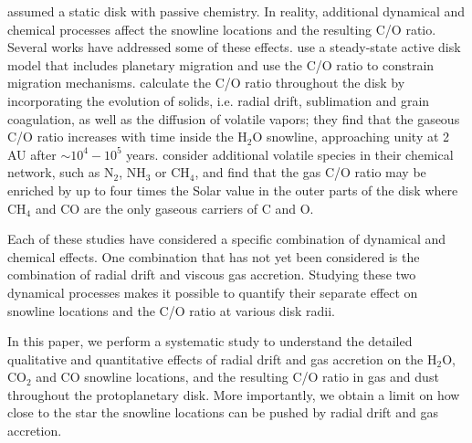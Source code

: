 \documentclass[apj]{emulateapj}
\newcommand{\emgr}[1]{\emph{ \color{gray} #1}}
\begin{document}
 
\citet{oberg11} assumed a static disk with passive chemistry. In reality, additional dynamical and chemical processes affect the snowline locations and the resulting C/O ratio. Several works have addressed some of these effects. \citet{madhu14} use a steady-state active disk model that includes planetary migration and use the C/O ratio to constrain migration mechanisms. \citealt{alidib14} calculate the C/O ratio throughout the disk by incorporating the evolution of solids, i.e. radial drift, sublimation and grain coagulation, as well as the diffusion of volatile vapors; they find that the gaseous C/O ratio increases with time inside the H$_2$O snowline, approaching unity at 2 AU after $\sim$$10^4-10^5$ years.  \citet{thiabaud15} consider additional volatile species in their chemical network, such as N$_2$, NH$_3$ or CH$_4$, and find that the gas C/O ratio may be enriched by up to four times the Solar value in the outer parts of the disk where CH$_4$ and CO are the only gaseous carriers of C and O.  

Each of these studies have considered a specific combination of dynamical and chemical effects. One combination that has not yet been considered is the combination of radial drift and viscous gas accretion. Studying these two dynamical processes makes it possible to quantify their separate effect on snowline locations and the C/O ratio at various disk radii.

In this paper, we perform a systematic study to understand the detailed qualitative and quantitative effects of radial drift and gas accretion on the H$_2$O, CO$_2$ and CO snowline locations, and the resulting C/O ratio in gas and dust throughout the protoplanetary disk. More importantly, we obtain a limit on how close to the star the snowline locations can be pushed by radial drift and gas accretion.   
\end{document}
